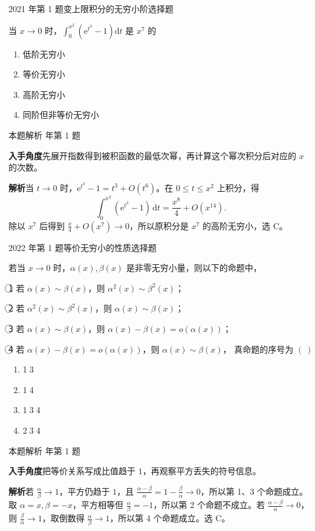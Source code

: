 \documentclass[UTF8,zihao=-4,fontset=fandol]{ctexart}
\newcommand{\circnum}[1]{\textcircled{\scriptsize #1}}
\newenvironment{abcd}{\begin{enumerate}[label=\textup{(\Alph*)},leftmargin=2.3em,itemsep=1pt,topsep=4pt,parsep=1pt]}{\end{enumerate}}
\newcommand{\choices}[4]{%
  \begin{abcd}
    \item #1
    \item #2
    \item #3
    \item #4
  \end{abcd}}
\newcommand{\QuestionPage}[6]{%
  \par\noindent\begin{minipage}{\linewidth}
  \raggedright
  {\small\textcolor{black!60}{#3\quad #5}\hfill\textcolor{accent}{#2}}\par\smallskip}
\newcommand{\QuestionEnd}{\end{minipage}\par\medskip}
\newcommand{\QuestionPage}[6]{%
  \clearpage
  {\small\textcolor{accent}{#1\hfill #2}}\par\medskip
  {\small\textcolor{black!60}{#3\quad #5\hfill #6}}\par\vspace{9bp}}
\newcommand{\QuestionEnd}{}
\newenvironment{QuestionSolution}[1]{%
  \clearpage
  {\small\textcolor{black!60}{本题解析\quad #1}}\par\medskip
}{\par\clearpage}
\begin{document}
\QuestionPage{1.4 无穷小量与无穷大量}{选择题}{2021 年第 1 题}{1}{变上限积分的无穷小阶}{026 / 234}
当 \(x \to 0\) 时，\(\int_{0}^{x^{2}} \left(\mathrm{e}^{t^3}-1\right) \mathrm{d} t\) 是 \(x^{7}\) 的
\choices{低阶无穷小}{等价无穷小}{高阶无穷小}{同阶但非等价无穷小}
\QuestionEnd

\begin{QuestionSolution}{2021 年第 1 题}
\textbf{入手角度}\quad 先展开指数得到被积函数的最低次幂，再计算这个幂次积分后对应的 \(x\) 的次数。

\textbf{解析}\quad 当 \(t\to0\) 时，\(\mathrm{e}^{t^3}-1=t^3+O(t^6)\)。在 \(0\le t\le x^2\) 上积分，得
\[
\int_0^{x^2}(\mathrm{e}^{t^3}-1)\,\mathrm{d}t
=\frac{x^8}{4}+O(x^{14}).
\]
除以 \(x^7\) 后得到 \(\frac{x}{4}+O(x^7)\to0\)，所以原积分是 \(x^7\) 的高阶无穷小，选 C。
\end{QuestionSolution}

\QuestionPage{1.4 无穷小量与无穷大量}{选择题}{2022 年第 1 题}{1}{等价无穷小的性质}{027 / 234}
若当 \(x \to 0\) 时，\(\alpha\left( x \right), \beta\left( x \right)\) 是非零无穷小量，则以下的命题中，
\par\circnum{1} 若 \(\alpha\left( x \right) \sim \beta\left( x \right)\)，则 \(\alpha^{2}\left( x \right) \sim \beta^{2}\left( x \right)\)；
\par\circnum{2} 若 \(\alpha^{2}\left( x \right) \sim \beta^{2}\left( x \right)\)，则 \(\alpha\left( x \right) \sim \beta\left( x \right)\)；
\par\circnum{3} 若 \(\alpha\left( x \right) \sim \beta\left( x \right)\)，则 \(\alpha\left( x \right) - \beta\left( x \right) = o\left( \alpha\left( x \right) \right)\)；
\par\circnum{4} 若 \(\alpha\left( x \right) - \beta\left( x \right) = o\left( \alpha\left( x \right) \right)\)，则 \(\alpha\left( x \right) \sim \beta\left( x \right)\)，
真命题的序号为 \(\left( \ \right)\)
\choices{\circnum{1}\circnum{3}}{\circnum{1}\circnum{4}}{\circnum{1}\circnum{3}\circnum{4}}{\circnum{2}\circnum{3}\circnum{4}}
\QuestionEnd

\begin{QuestionSolution}{2022 年第 1 题}
\textbf{入手角度}\quad 把等价关系写成比值趋于 \(1\)，再观察平方丢失的符号信息。

\textbf{解析}\quad 若 \(\frac{\alpha}{\beta}\to1\)，平方仍趋于 \(1\)，且 \(\frac{\alpha-\beta}{\alpha}=1-\frac{\beta}{\alpha}\to0\)，所以第 1、3 个命题成立。取 \(\alpha=x,\beta=-x\)，平方相等但 \(\frac{\alpha}{\beta}=-1\)，所以第 2 个命题不成立。若 \(\frac{\alpha-\beta}{\alpha}\to0\)，则 \(\frac{\beta}{\alpha}\to1\)，取倒数得 \(\frac{\alpha}{\beta}\to1\)，所以第 4 个命题成立。选 C。
\end{QuestionSolution}
\end{document}
